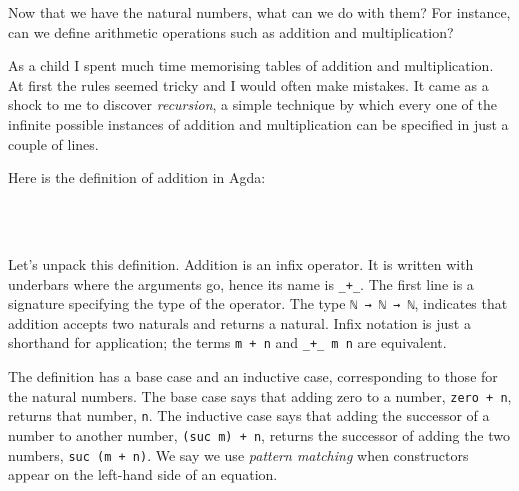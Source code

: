 Now that we have the natural numbers, what can we do with them? For
instance, can we define arithmetic operations such as addition and
multiplication?

As a child I spent much time memorising tables of addition and
multiplication. At first the rules seemed tricky and I would often make
mistakes. It came as a shock to me to discover \emph{recursion}, a
simple technique by which every one of the infinite possible instances
of addition and multiplication can be specified in just a couple of
lines.

Here is the definition of addition in Agda:

\begin{fence}
\begin{code}%
\>[0]\AgdaOperator{\AgdaFunction{\AgdaUnderscore{}+\AgdaUnderscore{}}}\AgdaSpace{}%
\AgdaSymbol{:}\AgdaSpace{}%
\AgdaSpace{}%
\AgdaSpace{}%
\AgdaSpace{}%
\AgdaSpace{}%
\<%
\\
\>[0]\AgdaSpace{}%
\AgdaOperator{\AgdaFunction{+}}\AgdaSpace{}%
\AgdaSpace{}%
\AgdaSymbol{=}\AgdaSpace{}%
\<%
\\
\>[0]\AgdaSymbol{(}\AgdaSpace{}%
\AgdaSymbol{)}\AgdaSpace{}%
\AgdaOperator{\AgdaFunction{+}}\AgdaSpace{}%
\AgdaSpace{}%
\AgdaSymbol{=}\AgdaSpace{}%
\AgdaSpace{}%
\AgdaSymbol{(}\AgdaSpace{}%
\AgdaOperator{\AgdaFunction{+}}\AgdaSpace{}%
\AgdaSymbol{)}\<%
\end{code}
\end{fence}

Let's unpack this definition. Addition is an infix operator. It is
written with underbars where the arguments go, hence its name is
\texttt{\_+\_}. The first line is a signature specifying the type of the
operator. The type \texttt{ℕ\ →\ ℕ\ →\ ℕ}, indicates that addition
accepts two naturals and returns a natural. Infix notation is just a
shorthand for application; the terms \texttt{m\ +\ n} and
\texttt{\_+\_\ m\ n} are equivalent.

The definition has a base case and an inductive case, corresponding to
those for the natural numbers. The base case says that adding zero to a
number, \texttt{zero\ +\ n}, returns that number, \texttt{n}. The
inductive case says that adding the successor of a number to another
number, \texttt{(suc\ m)\ +\ n}, returns the successor of adding the two
numbers, \texttt{suc\ (m\ +\ n)}. We say we use \emph{pattern matching}
when constructors appear on the left-hand side of an equation.

